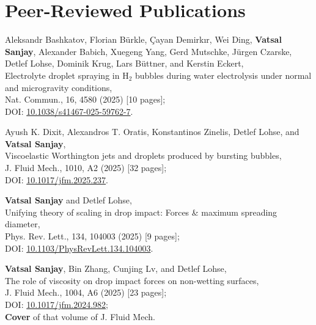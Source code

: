 \documentclass[10pt,a4paper,colorlinks,linkcolor=blue,urlcolor=blue,citecolor=blue]{moderncv}
\begin{document}
\section{Peer-Reviewed Publications}

\begin{enumerate}[leftmargin=1.5em,label=\textbf{[\arabic*]}]
	\item Aleksandr Bashkatov, Florian Bürkle, Çayan Demirkır, Wei Ding, \textbf{Vatsal Sanjay}, Alexander Babich, Xuegeng Yang, Gerd Mutschke, Jürgen Czarske, Detlef Lohse, Dominik Krug, Lars Büttner, and Kerstin Eckert,\\
	Electrolyte droplet spraying in H$_2$ bubbles during water electrolysis under normal and microgravity conditions,\\
	Nat. Commun., 16, 4580 (2025) [10 pages];\\
	\faFile\hspace{0.2em}DOI: \href{https://doi.org/10.1038/s41467-025-59762-7}{10.1038/s41467-025-59762-7}.

	\item Ayush K. Dixit, Alexandros T. Oratis, Konstantinos Zinelis, Detlef Lohse, and \textbf{Vatsal Sanjay},\\
	Viscoelastic Worthington jets and droplets produced by bursting bubbles,\\
	J. Fluid Mech., 1010, A2 (2025) [32 pages];\\
	\faFile\hspace{0.2em}DOI: \href{https://doi.org/10.1017/jfm.2025.237}{10.1017/jfm.2025.237}.

	\item \textbf{Vatsal Sanjay} and Detlef Lohse,\\
	Unifying theory of scaling in drop impact: Forces \& maximum spreading diameter,\\
	Phys. Rev. Lett., 134, 104003 (2025) [9 pages];\\
	\faFile\hspace{0.2em}DOI: \href{https://doi.org/10.1103/PhysRevLett.134.104003}{10.1103/PhysRevLett.134.104003}.

	\item \textbf{Vatsal Sanjay}, Bin Zhang, Cunjing Lv, and Detlef Lohse,\\
	The role of viscosity on drop impact forces on non-wetting surfaces,\\
	J. Fluid Mech., 1004, A6 (2025) [23 pages];\\
	\faFile\hspace{0.2em}DOI: \href{https://doi.org/10.1017/jfm.2024.982}{10.1017/jfm.2024.982};\\
	\faStar\hspace{0.2em}\textbf{Cover} of that volume of J. Fluid Mech.


\end{enumerate}
\end{document}
